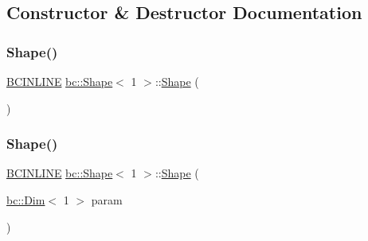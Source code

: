\subsection{Constructor \& Destructor Documentation}
\mbox{\label{structbc_1_1Shape_3_011_01_4_a4d79bc0de238798f475ebea13919a9b3}} 
\subsubsection{\texorpdfstring{Shape()}{Shape()}\hspace{0.1cm}{\footnotesize\ttfamily [1/4]}}
{\footnotesize\ttfamily \hyperlink{common_8h_a6699e8b0449da5c0fafb878e59c1d4b1}{B\+C\+I\+N\+L\+I\+NE} \hyperlink{structbc_1_1Shape}{bc\+::\+Shape}$<$ 1 $>$\+::\hyperlink{structbc_1_1Shape}{Shape} (\begin{DoxyParamCaption}{ }\end{DoxyParamCaption})\hspace{0.3cm}{\ttfamily [inline]}}

\mbox{\label{structbc_1_1Shape_3_011_01_4_a2f6566fbfb4b1a94f9a7afe2e79f3909}} 
\subsubsection{\texorpdfstring{Shape()}{Shape()}\hspace{0.1cm}{\footnotesize\ttfamily [2/4]}}
{\footnotesize\ttfamily \hyperlink{common_8h_a6699e8b0449da5c0fafb878e59c1d4b1}{B\+C\+I\+N\+L\+I\+NE} \hyperlink{structbc_1_1Shape}{bc\+::\+Shape}$<$ 1 $>$\+::\hyperlink{structbc_1_1Shape}{Shape} (\begin{DoxyParamCaption}\item[{\hyperlink{structbc_1_1Dim}{bc\+::\+Dim}$<$ 1 $>$}]{param }\end{DoxyParamCaption})\hspace{0.3cm}{\ttfamily [inline]}}

\mbox{\label{structbc_1_1Shape_3_011_01_4_a9f9b35ec4ed652992cd18984408c748d}} 
